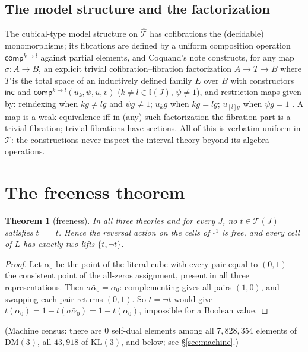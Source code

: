 \documentclass[11pt]{amsart}
\newtheorem{thm}{Theorem}[section]
\theoremstyle{definition}
\newcommand{\I}{\mathbb{I}}
\newcommand{\DM}{\mathrm{DM}}
\newcommand{\KL}{\mathrm{KL}}
\newcommand{\comp}{\mathsf{comp}}
\newcommand{\inc}{\mathsf{inc}}
\newcommand{\Ldash}{L}
\begin{document}
\subsection{The model structure and the factorization}

The cubical-type model structure on
$\widehat{\mathcal{T}}$ has cofibrations the (decidable)
monomorphisms; its fibrations are defined by a uniform composition
operation $\comp^{k \to l}$ against partial elements, and Coquand's
note constructs, for any map $\sigma : A \to B$, an explicit trivial
cofibration--fibration factorization $A \to T \to B$ where $T$ is
the total space of an inductively defined family $E$ over $B$ with
constructors $\inc$ and $\comp^{k \to l}(u_k, \psi, u, v)$
($k \neq l \in \I(J)$, $\psi \neq 1$), and restriction maps given
by: reindexing when $kg \neq lg$ and $\psi g \neq 1$;
$u_k g$ when $kg = lg$; $u_{[l]g}$ when $\psi g = 1$
\cite[\S3]{CoqNote}.  A map is a weak equivalence iff in (any) such
factorization the fibration part is a trivial fibration; trivial
fibrations have sections.  All of this is verbatim uniform in
$\mathcal{T}$: the constructions never inspect the interval theory
beyond its algebra operations.

\section{The freeness theorem}
\label{sec:free}

\begin{thm}[freeness]
  \label{thm:free}
  In all three theories and for every $J$, no $t \in \mathcal{T}(J)$
  satisfies $t = \neg t$.  Hence the reversal action on the cells of
  $\square^1$ is free, and every cell of $\Ldash$ has exactly two
  lifts $\{t, \neg t\}$.
\end{thm}

\begin{proof}
  Let $\alpha_0$ be the point of the literal cube with every pair
  equal to $(0,1)$ --- the consistent point of the all-zeros
  assignment, present in all three representations.  Then
  $\sigma\bar\alpha_0 = \alpha_0$: complementing gives all pairs
  $(1,0)$, and swapping each pair returns $(0,1)$.  So
  $t = \neg t$ would give
  $t(\alpha_0) = 1 - t(\sigma\bar\alpha_0) = 1 - t(\alpha_0)$,
  impossible for a Boolean value.
\end{proof}

(Machine census: there are $0$ self-dual elements among all
$7{,}828{,}354$ elements of $\DM(3)$, all $43{,}918$ of $\KL(3)$,
and below; see \S\ref{sec:machine}.)
\end{document}
